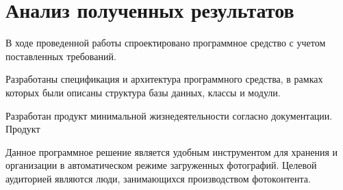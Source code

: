 \section{Анализ полученных результатов}

В ходе проведенной работы спроектировано программное средство с учетом поставленных требований. 

Разработаны спецификация и архитектура программного средства, в рамках которых были описаны структура базы данных, классы и модули.

Разработан продукт минимальной жизнедеятельности согласно документации.
Продукт 

Данное программное решение является удобным инструментом для хранения и организации в автоматическом режиме загруженных фотографий. Целевой аудиторией являются люди, занимающихся производством фотоконтента.

\clearpage
